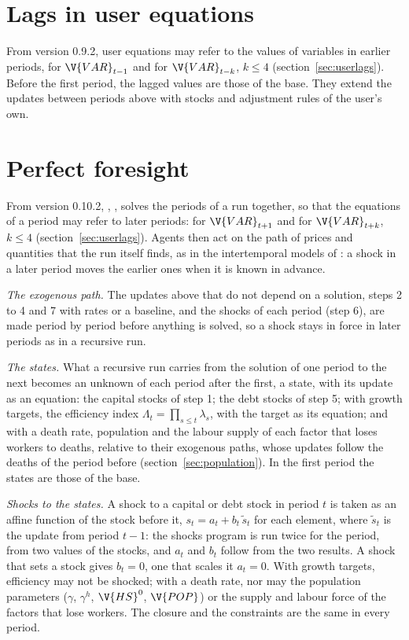 \section{Lags in user equations}

From version 0.9.2, user equations may refer to the values of variables in
earlier periods,  for $\V{VAR}_{t-1}$ and  for
$\V{VAR}_{t-k}$, $k \le 4$ (section~\ref{sec:userlags}). Before the first
period, the lagged values are those of the base. They extend the updates
between periods above with stocks and adjustment rules of the user's own.

\section{Perfect foresight}\label{sec:foresight}

From version 0.10.2, , , solves the
periods of a run together, so that the equations of a period may refer to
later periods:  for $\V{VAR}_{t+1}$ and  for
$\V{VAR}_{t+k}$, $k \le 4$ (section~\ref{sec:userlags}). Agents then act on
the path of prices and quantities that the run itself finds, as in the
intertemporal models of \citet{lau2002}: a shock in a later period moves the
earlier ones when it is known in advance.

\textit{The exogenous path.} The updates above that do not depend on a
solution, steps 2 to 4 and 7 with rates or a baseline, and the shocks of each
period (step 6), are made period by period before anything is solved, so a
shock stays in force in later periods as in a recursive run.

\textit{The states.} What a recursive run carries from the solution of one
period to the next becomes an unknown of each period after the first, a
state, with its update as an equation: the capital stocks of step 1; the debt
stocks of step 5; with growth targets, the efficiency index
$\Lambda_t = \prod_{s \le t} \lambda_s$, with the target as its equation; and
with a death rate, population and the labour supply of each factor that loses
workers to deaths, relative to their exogenous paths, whose updates follow
the deaths of the period before (section~\ref{sec:population}). In the first
period the states are those of the base.

\textit{Shocks to the states.} A shock to a capital or debt stock in period $t$
is taken as an affine function of the stock before it,
$s_t = a_t + b_t\,\tilde s_t$ for each element, where $\tilde s_t$ is the update
from period $t - 1$: the shocks program is run twice for the period, from two
values of the stocks, and $a_t$ and $b_t$ follow from the two results. A
shock that sets a stock gives $b_t = 0$, one that scales it $a_t = 0$. With
growth targets, efficiency may not be shocked; with a death rate, nor may the
population parameters ($\gamma$, $\gamma^h$, $\V{HS}^0$, $\V{POP}$) or the
supply and labour force of the factors that lose workers. The closure and the
constraints are the same in every period.

